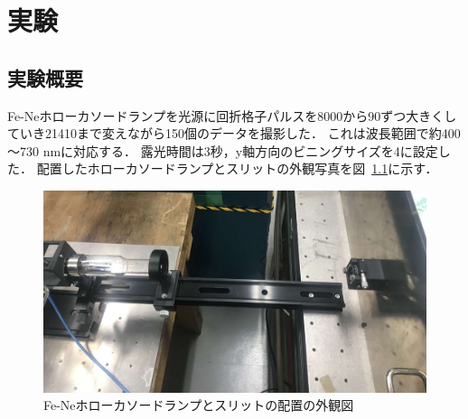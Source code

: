\chapter{実験}
\label{chap:evaluation}

\section{実験概要}
Fe-Neホローカソードランプを光源に回折格子パルスを8000から90ずつ大きくしていき21410まで変えながら150個のデータを撮影した．
これは波長範囲で約400～730 nmに対応する．
露光時間は3秒，y軸方向のビニングサイズを4に設定した．
配置したホローカソードランプとスリットの外観写真を図\ \ref{fig:lamp_slit}に示す．
\begin{figure}[htbp]
    \centering
    \includegraphics[scale=0.3]{figure/lamp_slit_compressed.pdf}
    \caption{Fe-Neホローカソードランプとスリットの配置の外観図}
    \label{fig:lamp_slit}
\end{figure}


